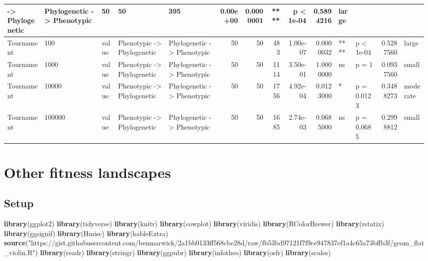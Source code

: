 \documentclass[]{book}
\newenvironment{Shaded}{\begin{snugshade}}{\end{snugshade}}
\newcommand{\KeywordTok}[1]{\textcolor[rgb]{0.13,0.29,0.53}{\textbf{#1}}}
\newcommand{\NormalTok}[1]{#1}
\newcommand{\StringTok}[1]{\textcolor[rgb]{0.31,0.60,0.02}{#1}}
\begin{document}
\begin{table}
\begin{tabular}[t]{l|l|l|l|l|r|r|r|r|r|l|l|r|l}
    ->
Phylogenetic & Phylogenetic
    ->
Phenotypic & 50 & 50 & 395 & 0.00e+00 & 0.0000001 & **** & p < 1e-04 & 0.5894216 & large\\
\hline
Tournament & 100 & value & Phenotypic
    ->
Phylogenetic & Phylogenetic
    ->
Phenotypic & 50 & 50 & 483 & 1.00e-07 & 0.0000032 & **** & p < 1e-04 & 0.5287560 & large\\
\hline
Tournament & 1000 & value & Phenotypic
    ->
Phylogenetic & Phylogenetic
    ->
Phenotypic & 50 & 50 & 1114 & 3.50e-01 & 1.0000000 & ns & p = 1 & 0.0937560 & small\\
\hline
Tournament & 10000 & value & Phenotypic
    ->
Phylogenetic & Phylogenetic
    ->
Phenotypic & 50 & 50 & 1756 & 4.92e-04 & 0.0123000 & * & p = 0.0123 & 0.3488273 & moderate\\
\hline
Tournament & 100000 & value & Phenotypic
    ->
Phylogenetic & Phylogenetic
    ->
Phenotypic & 50 & 50 & 1685 & 2.74e-03 & 0.0685000 & ns & p = 0.0685 & 0.2998812 & small\\
\hline
\end{tabular}
\end{table}

\hypertarget{other-fitness-landscapes}{%
\chapter{Other fitness landscapes}\label{other-fitness-landscapes}}

\hypertarget{setup-2}{%
\section{Setup}\label{setup-2}}

\begin{Shaded}
\begin{Highlighting}[]
\KeywordTok{library}\NormalTok{(ggplot2)}
\KeywordTok{library}\NormalTok{(tidyverse)}
\KeywordTok{library}\NormalTok{(knitr)}
\KeywordTok{library}\NormalTok{(cowplot)}
\KeywordTok{library}\NormalTok{(viridis)}
\KeywordTok{library}\NormalTok{(RColorBrewer)}
\KeywordTok{library}\NormalTok{(rstatix)}
\KeywordTok{library}\NormalTok{(ggsignif)}
\KeywordTok{library}\NormalTok{(Hmisc)}
\KeywordTok{library}\NormalTok{(kableExtra)}
\KeywordTok{source}\NormalTok{(}\StringTok{"https://gist.githubusercontent.com/benmarwick/2a1bb0133ff568cbe28d/raw/fb53bd97121f7f9ce947837ef1a4c65a73bffb3f/geom_flat_violin.R"}\NormalTok{)}
\KeywordTok{library}\NormalTok{(readr)}
\KeywordTok{library}\NormalTok{(stringr)}
\KeywordTok{library}\NormalTok{(ggpubr)}
\KeywordTok{library}\NormalTok{(infotheo)}
\KeywordTok{library}\NormalTok{(osfr)}
\KeywordTok{library}\NormalTok{(scales)}
\end{Highlighting}
\end{Shaded}
\end{document}
